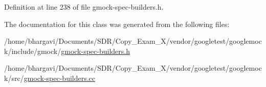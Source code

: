 Definition at line 238 of file gmock-\/spec-\/builders.\+h.



The documentation for this class was generated from the following files\+:\begin{DoxyCompactItemize}
\item 
/home/bhargavi/\+Documents/\+S\+D\+R/\+Copy\+\_\+\+Exam\+\_\+X/vendor/googletest/googlemock/include/gmock/\hyperlink{gmock-spec-builders_8h}{gmock-\/spec-\/builders.\+h}\item 
/home/bhargavi/\+Documents/\+S\+D\+R/\+Copy\+\_\+\+Exam\+\_\+X/vendor/googletest/googlemock/src/\hyperlink{gmock-spec-builders_8cc}{gmock-\/spec-\/builders.\+cc}\end{DoxyCompactItemize}
